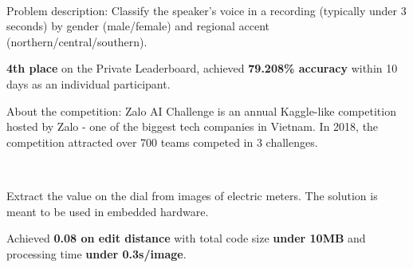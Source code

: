 \\
\begin{zitemize}
    \item Problem description: Classify the speaker's voice in a recording (typically
    under 3 seconds) by gender (male/female) and regional accent (northern/central/southern).
    \item \textbf{4th place} on the Private Leaderboard, achieved \textbf{79.208\%
        accuracy} within 10 days as an individual participant.
    \item About the competition: Zalo AI Challenge is an annual Kaggle-like competition hosted
    by Zalo - one of the biggest tech companies in Vietnam. In 2018, the competition attracted
    over 700 teams competed in 3 challenges.
\end{zitemize}

\\
\begin{zitemize}
    \item Extract the value on the dial from images of electric meters. The solution is meant to be used in embedded hardware.
    \item Achieved \textbf{0.08 on edit distance} with total code size
    \textbf{under 10MB} and processing time \textbf{under 0.3s/image}.
\end{zitemize}



